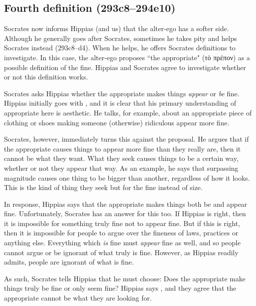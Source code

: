 \documentclass[12pt]{article}
\begin{document}

\subsection{Fourth definition (293c8--294e10)}

Socrates now informs Hippias (and us) that the alter-ego has a softer side.  Although he generally goes after Socrates, sometimes he takes pity and helps Socrates instead (293c8--d4).  When he helps, he offers Socrates definitions to investigate.  In this case, the alter-ego proposes ``the appropriate" (τὸ πρέπον) as a possible definition of the fine. Hippias and Socrates agree to investigate whether or not this definition works.

Socrates asks Hippias whether the appropriate makes things \emph{appear} or \emph{be} fine.  Hippias initially goes with , and it is clear that his primary understanding of appropriate here is aesthetic.  He talks, for example, about an appropriate piece of clothing or shoes making someone (otherwise) ridiculous appear more fine.

Socrates, however, immediately turns this against the proposal.  He argues that if the appropriate causes things to appear more fine than they really are, then it cannot be what they want.  What they seek causes things to be a certain way, whether or not they appear that way.  As an example, he says that surpassing magnitude causes one thing to be bigger than another, regardless of how it looks.  This is the kind of thing they seek but for the fine instead of size.

In response, Hippias says that the appropriate makes things both be and appear fine.  Unfortunately, Socrates has an answer for this too.  If Hippias is right, then it is impossible for something truly fine not to appear fine.  But if this is right, then it is impossible for people to argue over the fineness of laws, practices or anything else.  Everything which \emph{is} fine must \emph{appear} fine as well, and so people cannot argue or be ignorant of what truly is fine.  However, as Hippias readily admits, people are ignorant of what is fine.

As such, Socrates tells Hippias that he must choose: Does the appropriate make things truly be fine or only seem fine?  Hippias says , and they agree that the appropriate cannot be what they are looking for.

\end{document}
